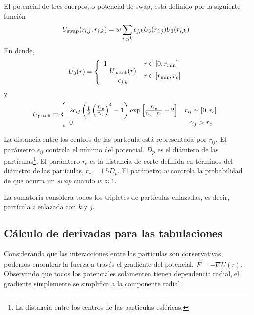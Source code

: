 \documentclass[../main.tex]{subfiles}
\begin{document}
El potencial de tres cuerpos, o potencial de swap, está definido por la siguiente función
\begin{gather}
    U_{\mathrm{swap}}\qty(r_{i,j},r_{i,k}) = w \sum_{i,j,k}\epsilon_{j,k} U_{3}\qty(r_{i,j})U_{3}\qty(r_{i,k}).\label{eqn:Uswap}
\end{gather}
En donde,
\begin{gather}
    U_{3}\qty(r) =
    \left\{
    \begin{array}{ll}
        1 & r\in\qty[0,r_{\min}] \\
        -\dfrac{U_{\mathrm{patch}}(r)}{\epsilon_{j,k}} & r\in\qty[r_{\min},r_c]
    \end{array}
    \right.\label{eqn:U3}
\end{gather}
y
\begin{gather}
    U_{\mathrm{patch}} = 
    \left\{
    \begin{array}{lc}
        2\epsilon_{ij}\left( \frac{1}{2}\left(\frac{D_p}{r_{ij}}\right)^{4}-1\right)\exp\left[\frac{D_{p}}{r_{ij}-r_{c}}+2\right]  & r_{ij}\in\qty[0,r_c] \\
        0 & r_{ij}>r_c
    \end{array}
    \right.\label{eqn:Upatch}
\end{gather}

La distancia entre los centros de las partícula está representada por \(r_{ij}\).
El parámetro \(\epsilon_{ij}\) controla el mínimo del potencial.
\(D_p\) es el diámtero de las partículas\footnote{La distancia entre los centros de las partículas esféricas.}.
El parámtero \(r_c\) es la distancia de corte definida en términos del diámetro de las partículas, \(r_c = 1.5 D_{p}\).
El parámetro \(w\) controla la probabilidad de que ocurra un \emph{swap} cuando \(w\approx1\).

La sumatoria considera todos los tripletes de partículas enlazadas, es decir, partícula $i$ enlazada con $k$ y $j$.

\subsection{Cálculo de derivadas para las tabulaciones}

Considerando que las interacciones entre las partículas son conservativas, podemos encontrar la fuerza a través el gradiente del potencial, \(\vec{F} = -\nabla U(r)\).
Observando que todos los potenciales solamenten tienen dependencia radial, el gradiente simplemente se simplifica a la componente radial.
\end{document}
